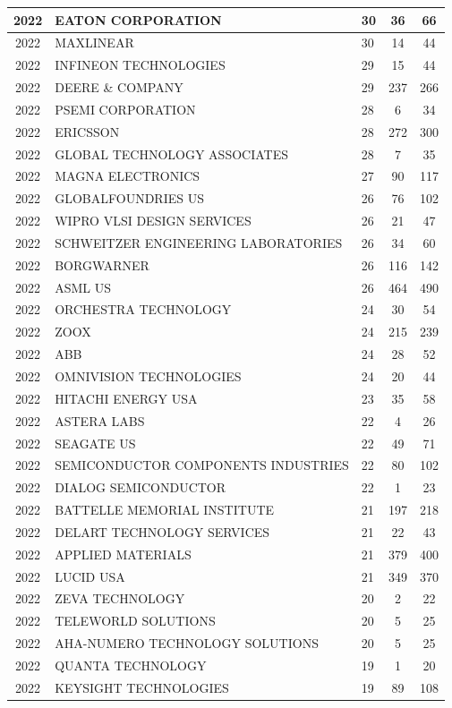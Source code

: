 \documentclass{article}%
\begin{document}
\begin{longtable}{c|p{20em}|p{5em}|c|c}
\hline%
2022&EATON CORPORATION&30&36&66\\%
\hline%
2022&MAXLINEAR&30&14&44\\%
\hline%
2022&INFINEON TECHNOLOGIES&29&15&44\\%
\hline%
2022&DEERE \& COMPANY&29&237&266\\%
\hline%
2022&PSEMI CORPORATION&28&6&34\\%
\hline%
2022&ERICSSON&28&272&300\\%
\hline%
2022&GLOBAL TECHNOLOGY ASSOCIATES&28&7&35\\%
\hline%
2022&MAGNA ELECTRONICS&27&90&117\\%
\hline%
2022&GLOBALFOUNDRIES US&26&76&102\\%
\hline%
2022&WIPRO VLSI DESIGN SERVICES&26&21&47\\%
\hline%
2022&SCHWEITZER ENGINEERING LABORATORIES&26&34&60\\%
\hline%
2022&BORGWARNER&26&116&142\\%
\hline%
2022&ASML US&26&464&490\\%
\hline%
2022&ORCHESTRA TECHNOLOGY&24&30&54\\%
\hline%
2022&ZOOX&24&215&239\\%
\hline%
2022&ABB&24&28&52\\%
\hline%
2022&OMNIVISION TECHNOLOGIES&24&20&44\\%
\hline%
2022&HITACHI ENERGY USA&23&35&58\\%
\hline%
2022&ASTERA LABS&22&4&26\\%
\hline%
2022&SEAGATE US&22&49&71\\%
\hline%
2022&SEMICONDUCTOR COMPONENTS INDUSTRIES&22&80&102\\%
\hline%
2022&DIALOG SEMICONDUCTOR&22&1&23\\%
\hline%
2022&BATTELLE MEMORIAL INSTITUTE&21&197&218\\%
\hline%
2022&DELART TECHNOLOGY SERVICES&21&22&43\\%
\hline%
2022&APPLIED MATERIALS&21&379&400\\%
\hline%
2022&LUCID USA&21&349&370\\%
\hline%
2022&ZEVA TECHNOLOGY&20&2&22\\%
\hline%
2022&TELEWORLD SOLUTIONS&20&5&25\\%
\hline%
2022&AHA{-}NUMERO TECHNOLOGY SOLUTIONS&20&5&25\\%
\hline%
2022&QUANTA TECHNOLOGY&19&1&20\\%
\hline%
2022&KEYSIGHT TECHNOLOGIES&19&89&108\\%

\end{longtable}
\end{document}
